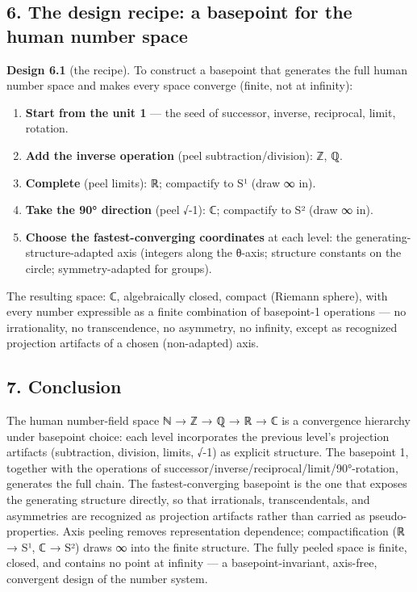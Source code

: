 \documentclass[
]{article}
\providecommand{\tightlist}{%
  \setlength{\itemsep}{0pt}\setlength{\parskip}{0pt}}
\begin{document}
\subsection{6. The design recipe: a basepoint for the human number
space}\label{the-design-recipe-a-basepoint-for-the-human-number-space}

\textbf{Design 6.1} (the recipe). To construct a basepoint that
generates the full human number space and makes every space converge
(finite, not at infinity):

\begin{enumerate}
\def\labelenumi{\arabic{enumi}.}
\tightlist
\item
  \textbf{Start from the unit 1} --- the seed of successor, inverse,
  reciprocal, limit, rotation.
\item
  \textbf{Add the inverse operation} (peel subtraction/division): ℤ, ℚ.
\item
  \textbf{Complete} (peel limits): ℝ; compactify to S¹ (draw ∞ in).
\item
  \textbf{Take the 90° direction} (peel √-1): ℂ; compactify to S² (draw
  ∞ in).
\item
  \textbf{Choose the fastest-converging coordinates} at each level: the
  generating-structure-adapted axis (integers along the θ-axis;
  structure constants on the circle; symmetry-adapted for groups).
\end{enumerate}

The resulting space: ℂ, algebraically closed, compact (Riemann sphere),
with every number expressible as a finite combination of basepoint-1
operations --- no irrationality, no transcendence, no asymmetry, no
infinity, except as recognized projection artifacts of a chosen
(non-adapted) axis.

\subsection{7. Conclusion}\label{conclusion}

The human number-field space ℕ → ℤ → ℚ → ℝ → ℂ is a convergence
hierarchy under basepoint choice: each level incorporates the previous
level's projection artifacts (subtraction, division, limits, √-1) as
explicit structure. The basepoint 1, together with the operations of
successor/inverse/reciprocal/limit/90°-rotation, generates the full
chain. The fastest-converging basepoint is the one that exposes the
generating structure directly, so that irrationals, transcendentals, and
asymmetries are recognized as projection artifacts rather than carried
as pseudo-properties. Axis peeling removes representation dependence;
compactification (ℝ → S¹, ℂ → S²) draws ∞ into the finite structure. The
fully peeled space is finite, closed, and contains no point at infinity
--- a basepoint-invariant, axis-free, convergent design of the number
system.
\end{document}
